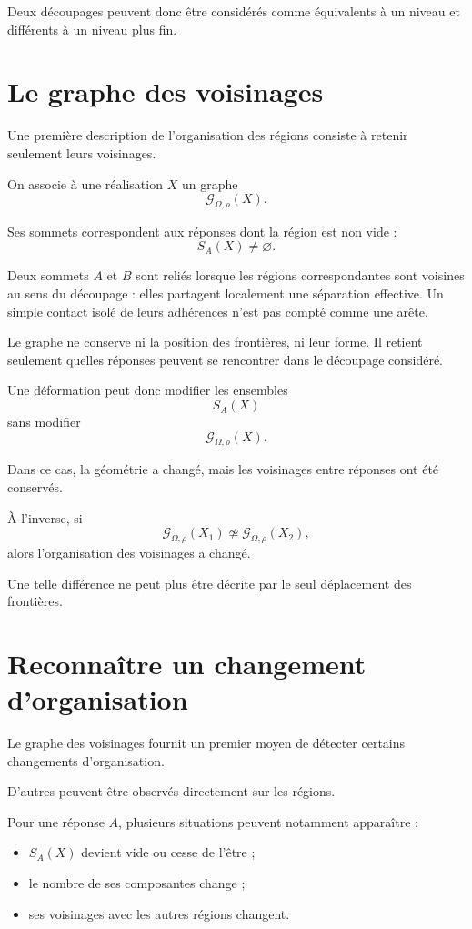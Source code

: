 Deux découpages peuvent donc être considérés comme équivalents à un niveau et différents à un niveau plus fin.

\section{Le graphe des voisinages}
\label{t3-graphe-voisinages}

Une première description de l'organisation des régions consiste à retenir seulement leurs voisinages.

On associe à une réalisation $X$ un graphe
\[
\mathcal G_{\Omega,\rho}(X).
\]

Ses sommets correspondent aux réponses dont la région est non vide :
\[
S_A(X)\neq\varnothing.
\]

Deux sommets \(A\) et \(B\) sont reliés lorsque les régions correspondantes sont voisines au sens du découpage : elles partagent localement une séparation effective. Un simple contact isolé de leurs adhérences n'est pas compté comme une arête.

Le graphe ne conserve ni la position des frontières, ni leur forme. Il retient seulement quelles réponses peuvent se rencontrer dans le
découpage considéré.

Une déformation peut donc modifier les ensembles
\[
S_A(X)
\]
sans modifier
\[
\mathcal G_{\Omega,\rho}(X).
\]

Dans ce cas, la géométrie a changé, mais les voisinages entre réponses ont été conservés.

À l'inverse, si
\[
\mathcal G_{\Omega,\rho}(X_1)
\not\simeq
\mathcal G_{\Omega,\rho}(X_2),
\]
alors l'organisation des voisinages a changé.

Une telle différence ne peut plus être décrite par le seul déplacement des frontières.

\section{Reconnaître un changement d'organisation}
\label{t3-reconnaitre-changement-organisation}

Le graphe des voisinages fournit un premier moyen de détecter certains changements d'organisation.

D'autres peuvent être observés directement sur les régions.

Pour une réponse $A$, plusieurs situations peuvent notamment apparaître :

\begin{itemize}
\tightlist
\item
  $S_A(X)$ devient vide ou cesse de l'être ;
\item
  le nombre de ses composantes change ;
\item
  ses voisinages avec les autres régions changent.
\end{itemize}


